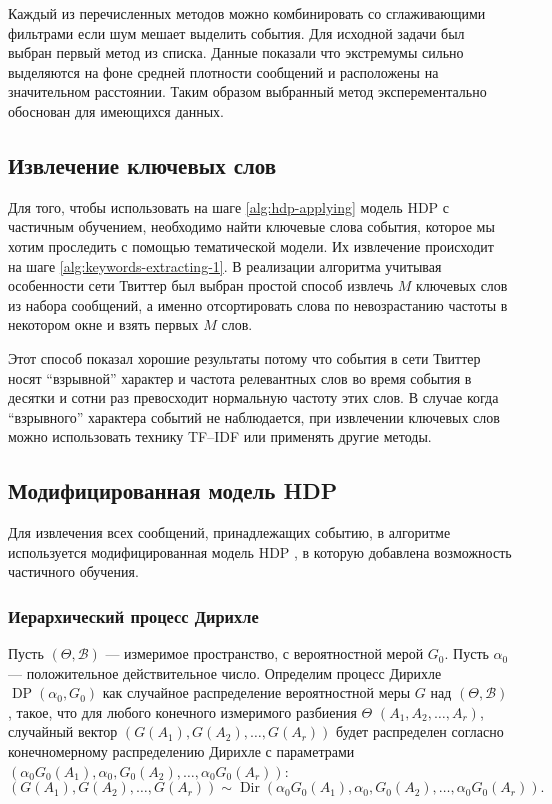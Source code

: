 \documentclass[12pt, a4paper]{article}
\DeclareMathOperator{\Dir}{Dir}
\DeclareMathOperator{\DP}{DP}
\begin{document}
  Каждый из перечисленных методов можно комбинировать со сглаживающими фильтрами если шум мешает выделить события.
  Для исходной задачи был выбран первый метод из списка. Данные показали что экстремумы сильно выделяются на фоне средней плотности сообщений и расположены на значительном расстоянии. Таким образом выбранный метод эксперементально обоснован для имеющихся данных.
  
  \subsection{Извлечение ключевых слов}
  Для того, чтобы использовать на шаге \ref{alg:hdp-applying} модель HDP с частичным обучением, необходимо найти ключевые слова события, которое мы хотим проследить с помощью тематической модели. Их извлечение происходит на шаге \ref{alg:keywords-extracting-1}. В реализации алгоритма учитывая особенности сети Твиттер был выбран простой способ извлечь $M$ ключевых слов из набора сообщений, а именно отсортировать слова по невозрастанию частоты в некотором окне и взять первых $M$ слов.
  
  Этот способ показал хорошие результаты потому что события в сети Твиттер носят ``взрывной'' характер и частота релевантных слов во время события в десятки и сотни раз превосходит нормальную частоту этих слов. В случае когда ``взрывного'' характера событий не наблюдается, при извлечении ключевых слов можно использовать технику TF--IDF или применять другие методы.
  
  \subsection{Модифицированная модель HDP}
  Для извлечения всех сообщений, принадлежащих событию, в алгоритме используется модифицированная модель HDP , в которую добавлена возможность частичного обучения.
  
  \subsubsection{Иерархический процесс Дирихле}
  Пусть $(\Theta, \mathcal{B})$ --- измеримое пространство, с вероятностной мерой $G_0$. Пусть $\alpha_0$ --- положительное действительное число. Определим процесс Дирихле $\DP(\alpha_0, G_0)$ как случайное распределение вероятностной меры $G$ над $(\Theta, \mathcal{B})$, такое, что для любого конечного измеримого разбиения $\Theta$ $(A_1, A_2, \ldots, A_r)$, случайный вектор $(G(A_1), G(A_2), \ldots, G(A_r))$ будет распределен согласно конечномерному распределению Дирихле с параметрами $(\alpha_0 G_0(A_1), \alpha_0, G_0(A_2), \ldots, \alpha_0 G_0 (A_r))$:
  \begin{equation}
  (G(A_1), G(A_2), \ldots, G(A_r)) \sim \Dir(\alpha_0 G_0(A_1), \alpha_0, G_0(A_2), \ldots, \alpha_0 G_0 (A_r)).
  \end{equation}
  
\end{document}
